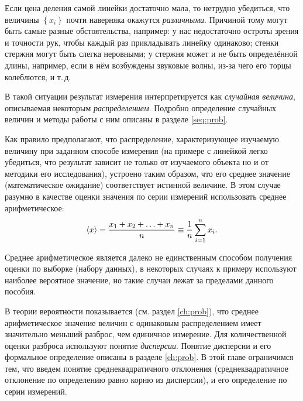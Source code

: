 Если цена деления самой линейки достаточно мала, то нетрудно убедиться, что
величины $\left\{ x_{i}\right\} $
почти наверняка окажутся \emph{различными}. Причиной тому могут быть
самые разные обстоятельства, например: у нас недостаточно остроты
зрения и точности рук, чтобы каждый раз прикладывать линейку одинаково;
стенки стержня могут быть слегка неровными; у стержня может и не быть
определённой длины, например, если в нём возбуждены звуковые волны,
из-за чего его торцы колеблются, и т.\,д.

В такой ситуации результат измерения интерпретируется как \emph{случайная
величина}, описываемая некоторым \emph{распределением}. Подробно определение
случайных величин и методы работы с ним описаны в разделе \ref{seq:prob}.

Как правило предполагают, что распределение, характеризующее изучаемую величину
при заданном способе измерения (на примере с линейкой легко убедиться, что
результат зависит не только от изучаемого объекта но и от методики его
исследования), устроено таким образом, что его среднее значение (математическое
ожидание) соответствует истинной величине.
В этом случае разумно в качестве оценки значения по серии измерений использовать
среднее арифметическое:
\begin{equation}
    \left<x\right>=\frac{x_{1}+x_{2}+\ldots+x_{n}}{n}\equiv\frac{1}{n}\sum\limits
_{i=1}^{n}x_{i}\label{eq:average}.
\end{equation}

Среднее арифметическое является далеко не единственным способом получения оценки
по выборке (набору данных), в некоторых случаях к примеру используют наиболее
вероятное значение, но такие случаи лежат за пределами данного пособия.

В теории вероятности показывается (см. раздел \ref{ch:prob}), что среднее
арифметическое значение величин с одинаковым распределением имеет значительно
меньший разброс, чем единичное измерение. Для количественной оценки разброса
используют понятие \emph{дисперсии}. Понятие дисперсии и его формальное
определение описаны в разделе \ref{ch:prob}. В этой главе ограничимся тем, что
введем понятие среднеквадратичного отклонения (среднеквадратичное отклонение по
определению равно корню из дисперсии), и его определение по серии измерений.


